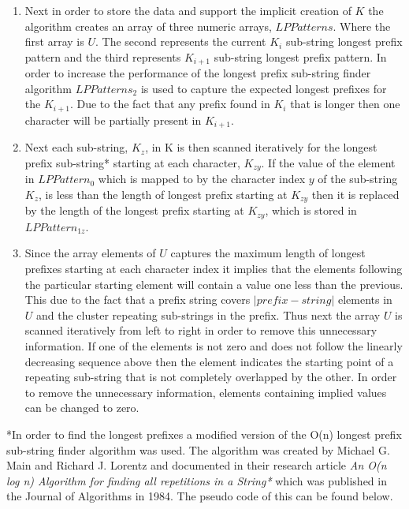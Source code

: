 \documentclass[12pt]{article}
\begin{document}
\begin{flushleft}
\begin{enumerate}
		\item Next in order to store the data and support the implicit creation of $K$ the algorithm creates an array of three numeric arrays, $LPPatterns$. Where the first array is $U$. The second represents the current $K_{i}$ sub-string longest prefix pattern and the third represents $K_{i + 1}$ sub-string longest prefix pattern. In order to increase the performance of the longest prefix sub-string finder algorithm $LPPatterns_{2}$ is used to capture the expected longest prefixes for the $K_{i + 1}$. Due to the fact that any prefix found in $K_{i}$ that is longer then one character will be partially present in $K_{i + 1}$.
		
		\item Next each sub-string, $K_{z}$, in K is then scanned iteratively for the longest prefix sub-string* starting at each character, $K_{zy}$. If the value of the element in $LPPattern_{0}$ which is mapped to by the character index $y$ of the sub-string $K_{z}$, is less than the length of longest prefix starting at $K_{zy}$ then it is replaced by the length of the longest prefix starting at $K_{zy}$, which is stored in $LPPattern_{1z}$. \\
						
		\item Since the array elements of $U$ captures the maximum length of longest prefixes starting at each character index it implies that the elements following the particular starting element will contain a value one less than the previous. This due to the fact that a prefix string covers $|prefix-string|$ elements in $U$ and the cluster repeating sub-strings in the prefix. Thus next the array $U$ is scanned iteratively from left to right in order to remove this unnecessary information. If one of the elements is not zero and does not follow the linearly decreasing sequence above then the element indicates the starting point of a repeating sub-string that is not completely overlapped by the other. In order to remove the unnecessary information, elements containing implied values can be changed to zero.
		
		\end{enumerate}
				  
		*In order to find the longest prefixes a modified version of the O(n) longest prefix sub-string finder algorithm was used. The algorithm was created by Michael G. Main and Richard J. Lorentz and documented in their research article \textit{An O(n log n) Algorithm for finding all repetitions in a String*} which was published in the Journal of Algorithms in 1984. The pseudo code of this can be found below.\\
		\newpage

\end{flushleft}
\end{document}
